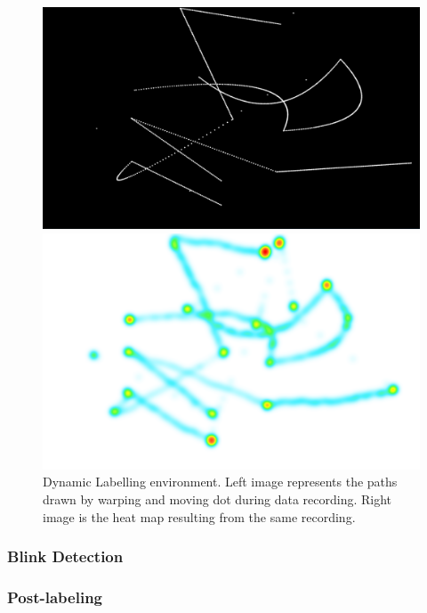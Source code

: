 \begin{figure}
    \centering
    \begin{minipage}{0.5\textwidth}
        \centering
        \includegraphics[width=\textwidth]{Images/Labelling/DynamicEnvScreen.png} %
    \end{minipage}\hfill
    \begin{minipage}{0.5\textwidth}
        \centering
        \includegraphics[width=\textwidth]{Images/Labelling/DynamicEnvHm.png}%
    \end{minipage}
    \caption{Dynamic Labelling environment. Left image represents the paths drawn by warping and moving dot during data recording. Right image is the heat map resulting from the same recording.}
    \label{fig:meth_DynamicLabellingEnv}
\end{figure}

\subsubsection{Blink Detection}

\subsubsection{Post-labeling}